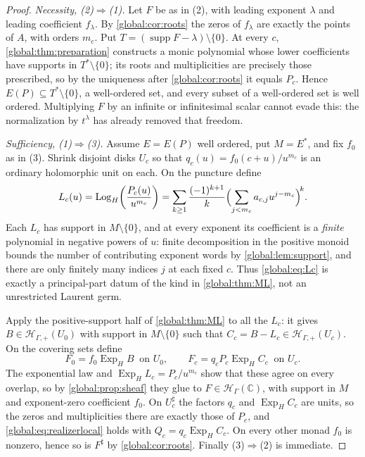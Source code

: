 \documentclass[11pt,letterpaper]{article}
\theoremstyle{definition}
\theoremstyle{remark}
\newcommand{\C}{\mathbb C}
\newcommand{\HH}{\mathscr H_\Gamma}
\newcommand{\HP}{\mathscr H_{\Gamma,+}}
\newcommand{\sh}{^{\sharp}}
\newcommand{\supp}{\operatorname{supp}}
\newcommand{\ExpH}{\operatorname{Exp}_{H}}
\newcommand{\LogH}{\operatorname{Log}_{H}}
\numberwithin{equation}{section}
\begin{document}
\begin{proof}
\emph{Necessity, (2)$\Rightarrow$(1).} Let $F$ be as in (2), with leading exponent $\lambda$ and leading coefficient $f_\lambda$. By \cref{global:cor:roots} the zeros of $f_\lambda$ are exactly the points of $A$, with orders $m_c$. Put $T=(\supp F-\lambda)\setminus\{0\}$. At every $c$, \cref{global:thm:preparation} constructs a monic polynomial whose lower coefficients have supports in $T^*\setminus\{0\}$; its roots and multiplicities are precisely those prescribed, so by the uniqueness after \cref{global:cor:roots} it equals $P_c$. Hence $E(P)\subseteq T^*\setminus\{0\}$, a well-ordered set, and every subset of a well-ordered set is well ordered. Multiplying $F$ by an infinite or infinitesimal scalar cannot evade this: the normalization by $t^\lambda$ has already removed that freedom.

\emph{Sufficiency, (1)$\Rightarrow$(3).} Assume $E=E(P)$ well ordered, put $M=E^*$, and fix $f_0$ as in (3). Shrink disjoint disks $U_c$ so that $q_c(u)=f_0(c+u)/u^{m_c}$ is an ordinary holomorphic unit on each. On the puncture define
\begin{equation}\label{global:eq:Lc}
  L_c(u)=\LogH\!\left(\frac{P_c(u)}{u^{m_c}}\right)
  =\sum_{k\ge1}\frac{(-1)^{k+1}}{k}
  \Bigl(\sum_{j<m_c}a_{c,j}u^{j-m_c}\Bigr)^{\!k}.
\end{equation}
Each $L_c$ has support in $M\setminus\{0\}$, and at every exponent its coefficient is a \emph{finite} polynomial in negative powers of $u$: finite decomposition in the positive monoid bounds the number of contributing exponent words by \cref{global:lem:support}, and there are only finitely many indices $j$ at each fixed $c$. Thus \eqref{global:eq:Lc} is exactly a principal-part datum of the kind in \cref{global:thm:ML}, not an unrestricted Laurent germ.

Apply the positive-support half of \cref{global:thm:ML} to all the $L_c$: it gives $B\in\HP(U_0)$ with support in $M\setminus\{0\}$ such that $C_c=B-L_c\in\HP(U_c)$. On the covering sets define
\begin{equation}\label{global:eq:Fglue}
  F_0=f_0\ExpH B\ \text{ on }U_0,
  \qquad
  F_c=q_cP_c\ExpH C_c\ \text{ on }U_c .
\end{equation}
The exponential law and $\ExpH L_c=P_c/u^{m_c}$ show that these agree on every overlap, so by \cref{global:prop:sheaf} they glue to $F\in\HH(\C)$, with support in $M$ and exponent-zero coefficient $f_0$. On $U_c\sh$ the factors $q_c$ and $\ExpH C_c$ are units, so the zeros and multiplicities there are exactly those of $P_c$, and \eqref{global:eq:realizerlocal} holds with $Q_c=q_c\ExpH C_c$. On every other monad $f_0$ is nonzero, hence so is $F\sh$ by \cref{global:cor:roots}. Finally (3)$\Rightarrow$(2) is immediate.
\end{proof}
\end{document}
